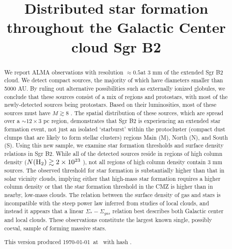 \documentclass[twocolumn]{aastex61}
\begin{document}
\title{Distributed star formation throughout the Galactic Center cloud Sgr B2}

\begin{abstract}
We report ALMA observations with resolution $\approx0.5$\arcsec at 3 mm  of
the extended Sgr B2 cloud. We detect \ncores compact sources, the majority of
which have diameters smaller than 5000 AU.  By ruling out alternative
possibilities such as externally ionized
globules, we conclude that these sources consist of a mix of \hchii regions
and protostars, with most of the newly-detected sources being protostars.
Based on their luminosities, most of these sources must have $M\gtrsim8$ \msun.
The
spatial distribution of these
sources, which are spread over a $\sim12\times3$ pc region, demonstrates that
Sgr B2 is experiencing an extended star
formation event, not just an isolated `starburst' within the protocluster
(compact dust clumps that are likely to form stellar clusters) regions Main
(M), North (N), and South (S).
Using this new sample, we examine star formation thresholds and surface
density relations in Sgr B2.
While all of the detected
sources reside in regions of high column density ($N(\textrm{H}_{2})\gtrsim2\times10^{23}$
\persc), not all regions of high column density
contain 3 mm sources.
The observed threshold for star formation is substantially higher than that in
solar vicinity clouds, implying either that high-mass star formation requires a
higher column density or that the star formation threshold in the CMZ is higher
than in nearby, low-mass clouds.
The relation between the surface density of gas and stars is incompatible
with the steep power law inferred from studies of local clouds, and instead it
appears that a linear $\Sigma_*-\Sigma_{gas}$ relation best describes both
Galactic center and local clouds.
These observations constitute the largest known single, possibly
coeval, sample of forming massive stars.


This version produced \today\ at \currenttime\ with hash \githash.
\end{abstract}
\end{document}
